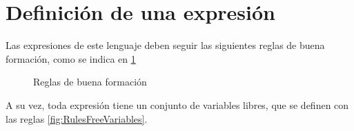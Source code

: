\section{Definición de una expresión}

Las expresiones de este lenguaje deben seguir las siguientes reglas de buena formación, como se indica en \ref{fig:RulesWellFormed}

\begin{figure}[h]

\centering

\begin{subfigure}{0.5\linewidth}
\centering
{}
\end{subfigure}%

\bigskip

\begin{subfigure}{0.5\linewidth}
\centering
{}
\end{subfigure}%

\bigskip

\begin{subfigure}{0.5\linewidth}
\centering
{}
\end{subfigure}%

\bigskip

\begin{subfigure}{0.5\linewidth}
\centering
{}
\end{subfigure}%

\caption{Reglas de buena formación}
\label{fig:RulesWellFormed}
\end{figure}

A su vez, toda expresión tiene un conjunto de variables libres, que se definen con las reglas \ref{fig:RulesFreeVariables}.

